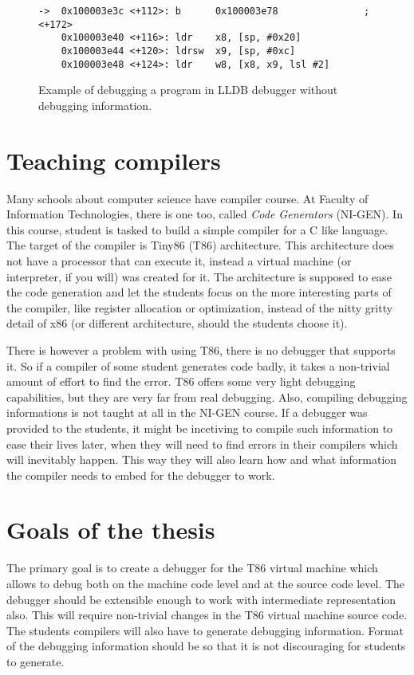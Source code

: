 \begin{figure}\label{fig:lldb-debug2}
\begin{lstlisting}
->  0x100003e3c <+112>: b      0x100003e78               ; <+172>
    0x100003e40 <+116>: ldr    x8, [sp, #0x20]
    0x100003e44 <+120>: ldrsw  x9, [sp, #0xc]
    0x100003e48 <+124>: ldr    w8, [x8, x9, lsl #2]
\end{lstlisting}
\caption{Example of debugging a program in LLDB debugger without debugging information.}
\end{figure}

\section{Teaching compilers}
Many schools about computer science have compiler course. At Faculty of Information Technologies, there is one too, called \textit{Code Generators} (NI-GEN). In this course, student is tasked to build a simple compiler for a C like language. The target of the compiler is Tiny86 (T86) architecture. This architecture  does not have a processor that can execute it, instead a virtual machine (or interpreter, if you will) was created for it. The architecture is supposed to ease the code generation and let the students focus on the more interesting parts of the compiler, like register allocation or optimization, instead of the nitty gritty detail of x86 (or different architecture, should the students choose it).

There is however a problem with using T86, there is no debugger that supports it. So if a compiler of some student generates code badly, it takes a non-trivial amount of effort to find the error. T86 offers some very light debugging capabilities, but they are very far from real debugging. Also, compiling debugging informations is not taught at all in the NI-GEN course. If a debugger was provided to the students, it might be incetiving to compile such information to ease their lives later, when they will need to find errors in their compilers which will inevitably happen. This way they will also learn how and what information the compiler needs to embed for the debugger to work.

\section{Goals of the thesis}
The primary goal is to create a debugger for the T86 virtual machine which allows to debug both on the machine code level and at the source code level. The debugger should be extensible enough to work with intermediate representation also. This will require non-trivial changes in the T86 virtual machine source code. The students compilers will also have to generate debugging information. Format of the debugging information should be so that it is not discouraging for students to generate.

